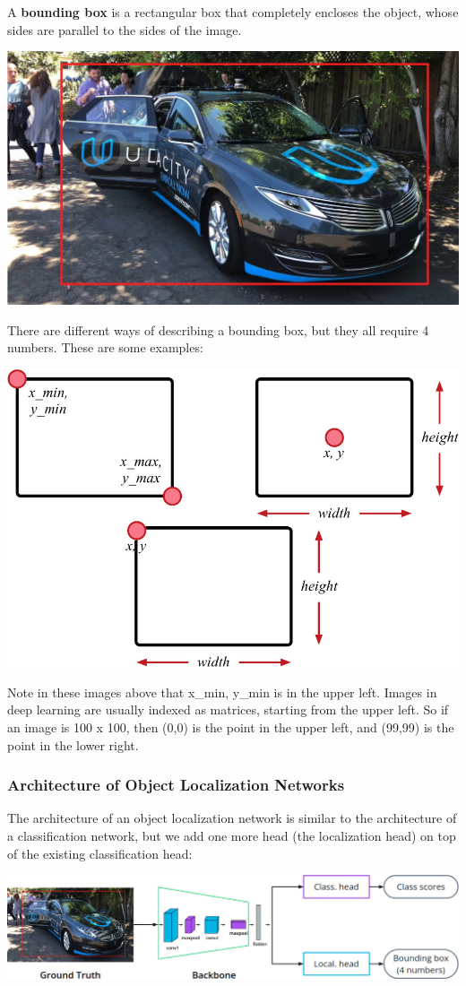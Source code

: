 A \textbf{bounding box} is a rectangular box that completely encloses the object, whose sides are parallel to the sides of the image.

\includegraphics[width=0.5\linewidth]{img//cnn//object/localization.jpeg}

There are different ways of describing a bounding box, but they all require 4 numbers. These are some examples:

\includegraphics[width=0.5\linewidth]{img//cnn//object/bounding-boxes.jpg}

Note in these images above that x\_min, y\_min is in the upper left. Images in deep learning are usually indexed as matrices, starting from the upper left. So if an image is 100 x 100, then (0,0) is the point in the upper left, and (99,99) is the point in the lower right.


\subsubsection{Architecture of Object Localization Networks}

The architecture of an object localization network is similar to the architecture of a classification network, but we add one more head (the localization head) on top of the existing classification head:

\includegraphics[width=1\linewidth]{img//cnn//object/obj-loc-arch.jpg}

